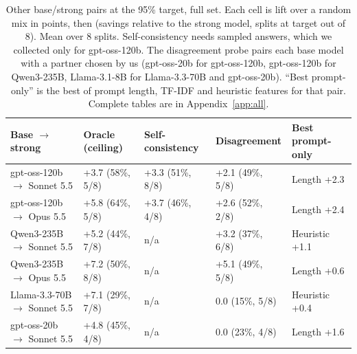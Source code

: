 \begin{table}[!htbp]
\centering\small
\caption{Other base/strong pairs at the 95\% target, full set. Each cell is lift over a random mix in points, then (savings relative to the strong model, splits at target out of 8). Mean over 8 splits. Self-consistency needs sampled answers, which we collected only for gpt-oss-120b. The disagreement probe pairs each base model with a partner chosen by us (gpt-oss-20b for gpt-oss-120b, gpt-oss-120b for Qwen3-235B, Llama-3.1-8B for Llama-3.3-70B and gpt-oss-20b). ``Best prompt-only'' is the best of prompt length, TF-IDF and heuristic features for that pair. Complete tables are in Appendix~\ref{app:all}.}\label{tab:pairs}
\begin{tabular}{lllll}
\toprule
Base $\to$ strong & Oracle (ceiling) & Self-consistency & Disagreement & Best prompt-only \\
\midrule
gpt-oss-120b $\to$ Sonnet 5.5 & +3.7 (58\%, 5/8) & +3.3 (51\%, 8/8) & +2.1 (49\%, 5/8) & Length +2.3 \\
gpt-oss-120b $\to$ Opus 5.5 & +5.8 (64\%, 5/8) & +3.7 (46\%, 4/8) & +2.6 (52\%, 2/8) & Length +2.4 \\
Qwen3-235B $\to$ Sonnet 5.5 & +5.2 (44\%, 7/8) & n/a & +3.2 (37\%, 6/8) & Heuristic +1.1 \\
Qwen3-235B $\to$ Opus 5.5 & +7.2 (50\%, 8/8) & n/a & +5.1 (49\%, 5/8) & Length +0.6 \\
Llama-3.3-70B $\to$ Sonnet 5.5 & +7.1 (29\%, 7/8) & n/a & 0.0 (15\%, 5/8) & Heuristic +0.4 \\
gpt-oss-20b $\to$ Sonnet 5.5 & +4.8 (45\%, 4/8) & n/a & 0.0 (23\%, 4/8) & Length +1.6 \\
\bottomrule
\end{tabular}
\end{table}
